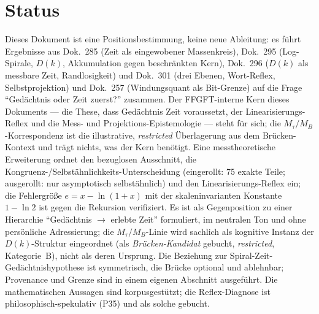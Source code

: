 \section{Status}

Dieses Dokument ist eine Positionsbestimmung, keine neue Ableitung: es führt Ergebnisse aus
Dok.~285 (Zeit als eingewobener Massenkreis), Dok.~295 (Log-Spirale, $D(k)$, Akkumulation
gegen beschränkten Kern), Dok.~296 ($D(k)$ als messbare Zeit, Randlosigkeit) und Dok.~301
(drei Ebenen, Wort-Reflex, Selbstprojektion) und Dok.~257 (Windungsquant als Bit-Grenze) auf
die Frage \enquote{Gedächtnis oder Zeit zuerst?} zusammen. Der FFGFT-interne Kern dieses
Dokuments --- die These, dass Gedächtnis Zeit voraussetzt, der Linearisierungs-Reflex und die
Mess- und Projektions-Epistemologie --- steht für sich; die $M_\tau/M_B$-Korrespondenz ist die
illustrative, \emph{restricted} Überlagerung aus dem Brücken-Kontext und trägt nichts, was der
Kern benötigt. Eine messtheoretische Erweiterung
ordnet den bezuglosen Ausschnitt, die Kongruenz-/Selbstähnlichkeits-Unterscheidung
(eingerollt: 75 exakte Teile; ausgerollt: nur asymptotisch selbstähnlich) und den
Linearisierungs-Reflex ein; die Fehlergröße
$e=x-\ln(1+x)$ mit der skaleninvarianten Konstante $1-\ln 2$ ist gegen die Rekursion
verifiziert. Es ist als Gegenposition zu einer Hierarchie \enquote{Gedächtnis $\to$
erlebte Zeit} formuliert, im neutralen Ton und ohne persönliche Adressierung; die
$M_\tau/M_B$-Linie wird sachlich als kognitive Instanz der $D(k)$-Struktur eingeordnet
(als \emph{Brücken-Kandidat} gebucht, \emph{restricted}, Kategorie~B), nicht als deren Ursprung. Die Beziehung zur
Spiral-Zeit-Gedächtnishypothese ist symmetrisch, die Brücke optional und ablehnbar; Provenance
und Grenze sind in einem eigenen Abschnitt ausgeführt. Die mathematischen Aussagen sind korpusgestützt; die Reflex-Diagnose ist
philosophisch-spekulativ (P35) und als solche gebucht.
